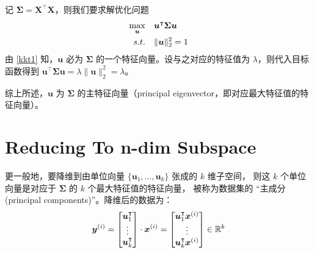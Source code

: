 		记 $ \bm{\Sigma} = \bm{X}^\intercal \bm{X} $，则我们要求解优化问题
		\begin{align}
			\max_{\bm{u}} \quad & \bm{u}^\intercal \bm{\Sigma} \bm{u} \\
			s.t. \quad & \| \bm{u} \|_2^2 = 1
		\end{align}
		由 \eqref{kkt1} 知，$ \bm{u} $ 必为 $ \bm{\Sigma} $ 的一个特征向量。设与之对应的特征值为 $ \lambda $，则代入目标函数得到 $ \bm{u}^\intercal \bm{\Sigma} \bm{u} = \lambda \| \bm{u} \|_2^2 = \lambda $。
		
		综上所述，$ \bm{u} $ 为 $ \bm{\Sigma} $ 的主特征向量（principal eigenvector，即对应最大特征值的特征向量）。
		
	\section{Reducing To n-dim Subspace}
		更一般地，要降维到由单位向量 $ \{ \bm{u}_1, \ldots, \bm{u}_k \} $ 张成的 $ k $ 维子空间，
		则这 $ k $ 个单位向量是对应于 $ \bm{\Sigma} $ 的 $ k $ 个最大特征值的特征向量，
		被称为数据集的 “主成分(principal components)”。降维后的数据为：
		\begin{equation}
			\bm{y}^{(i)} = 
			\begin{bmatrix}
				\bm{u}_1^\intercal \\
				\vdots \\
				\bm{u}_k^\intercal
			\end{bmatrix} \cdot \bm{x}^{(i)} \\
			= \begin{bmatrix}
				\bm{u}_1^\intercal \bm{x}^{(i)} \\
				\vdots \\
				\bm{u}_k^\intercal \bm{x}^{(i)}
			\end{bmatrix} \in \mathbb{R}^k
		\end{equation}
		
